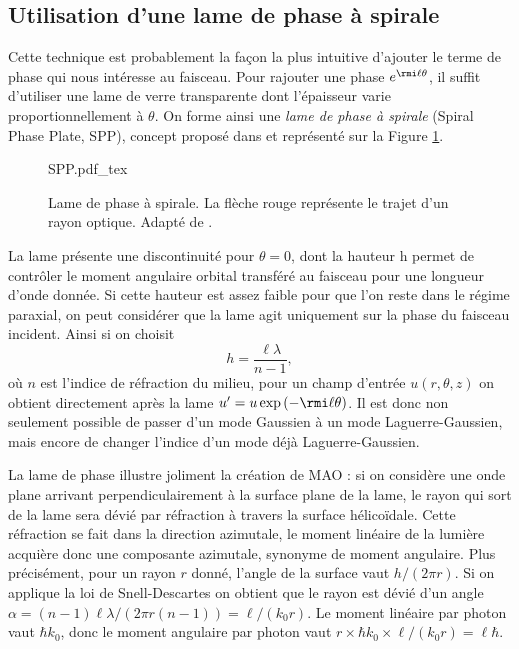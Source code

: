 \subsection{Utilisation d'une lame de phase à spirale}
Cette technique est probablement la façon la plus intuitive d'ajouter le terme de phase qui nous intéresse au faisceau. Pour rajouter une phase $e^{\rmi\ell\theta}$, il suffit d'utiliser une lame de verre transparente dont l'épaisseur varie proportionnellement à $\theta$. On forme ainsi une \textit{lame de phase à spirale} (Spiral Phase Plate, SPP), concept proposé dans  et représenté sur la Figure \ref{Fig:SPP}.\par
\begin{figure}[!ht]
\centering
\def\svgwidth{0.5\columnwidth}
{SPP.pdf_tex}
\caption{Lame de phase à spirale. La flèche rouge représente le trajet d'un rayon optique. Adapté de .}
\label{Fig:SPP}
\end{figure}
La lame présente une discontinuité pour $\theta=0$\degres, dont la hauteur h permet de contrôler le moment angulaire orbital transféré au faisceau pour une longueur d'onde donnée. Si cette hauteur est assez faible pour que l'on reste dans le régime paraxial, on peut considérer que la lame agit uniquement sur la phase du faisceau incident. Ainsi si on choisit 
\begin{equation*}
h = \frac{\ell\lambda}{n-1},
\end{equation*}
où $n$ est l'indice de réfraction du milieu, pour un champ d'entrée $u(r,\theta,z)$ on obtient directement après la lame $u' = u\exp{(-\rmi \ell \theta)}$.	Il est donc non seulement possible de passer d'un mode Gaussien à un mode Laguerre-Gaussien, mais encore de changer l'indice d'un mode déjà Laguerre-Gaussien.\par
La lame de phase illustre joliment la création de MAO : si on considère une onde plane arrivant perpendiculairement à la surface plane de la lame, le rayon qui sort de la lame sera dévié par réfraction à travers la surface hélicoïdale. Cette réfraction se fait dans la direction azimutale, le moment linéaire de la lumière acquière donc une composante azimutale, synonyme de moment angulaire. Plus précisément, pour un rayon $r$ donné, l'angle de la surface	vaut $h/(2\pi r)$. Si on applique la loi de Snell-Descartes on obtient que le rayon est dévié d'un angle $\alpha = (n-1)\ell\lambda/(2\pi r(n-1)) = \ell/(k_0r)$. Le moment linéaire par photon vaut $\hbar k_0$, donc le moment angulaire par photon vaut $r\times\hbar k_0\times\ell/(k_0r) = \ell\hbar$.


